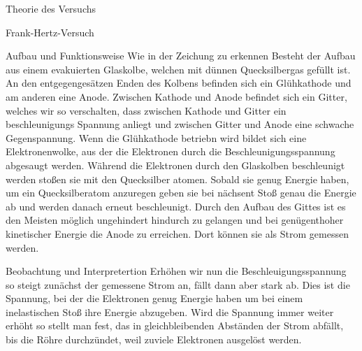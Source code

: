 \documentclass[pdftex, a4paper,11pt, twoside, ngerman]{report}
\begin{document}
\begin{chapter}{Theorie des Versuchs}
\begin{section}{Frank-Hertz-Versuch}
        \begin{subsection}{Aufbau und Funktionsweise}
            Wie in der Zeichung zu erkennen Besteht der Aufbau aus einem evakuierten Glaskolbe, welchen mit dünnen Quecksilbergas gefüllt ist. 
            An den entgegengesätzen Enden des Kolbens befinden sich ein Glühkathode und am anderen eine Anode. 
            Zwischen Kathode und Anode befindet sich ein Gitter, welches wir so verschalten, dass zwischen Kathode und Gitter ein beschleunigungs Spannung anliegt und zwischen Gitter und Anode eine schwache Gegenspannung.
            Wenn die Glühkathode betriebn wird bildet sich eine Elektronenwolke, aus der die Elektronen durch die Beschleunigungsspannung abgesaugt werden.
            Während die Elektronen durch den Glaskolben beschleunigt werden stoßen sie mit den Quecksilber atomen.
            Sobald sie genug Energie haben, um ein Quecksilberatom anzuregen geben sie bei nächsent Stoß genau die Energie ab und werden danach erneut beschleunigt.
            Durch den Aufbau des Gittes ist es den Meisten möglich ungehindert hindurch zu gelangen und bei genügenthoher kinetischer Energie die Anode zu erreichen.
            Dort können sie als Strom gemessen werden.
            

        \end{subsection}
        \begin{subsection}{Beobachtung und Interpretertion}
            Erhöhen wir nun die Beschleuigungsspannung so steigt zunächst der gemessene Strom an, fällt dann aber stark ab.
            Dies ist die Spannung, bei der die Elektronen genug Energie haben um bei einem inelastischen Stoß ihre Energie abzugeben.
            Wird die Spannung immer weiter erhöht so stellt man fest, das in gleichbleibenden Abständen der Strom abfällt, bis die Röhre durchzündet, weil zuviele Elektronen ausgelöst werden. 


\end{subsection}
\end{section}
\end{chapter}
\end{document}
